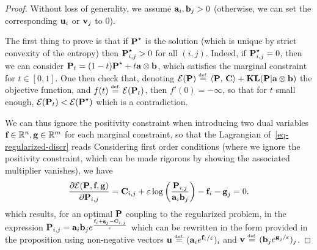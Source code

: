 \begin{proof} 
Without loss of generality, we assume $\a_i,\b_j>0$ (otherwise, we can set the corresponding $\uD_i$ or $\vD_j$ to 0).

The first thing to prove is that if $\P^\star$ is the solution (which is unique by strict convexity of the entropy) then $\P_{i,j}^\star>0$ for all $(i,j)$. Indeed, if $\P_{i,j}^\star=0$, then we can consider $\P_t = (1-t)\P^\star + t \a \otimes \b$, which satisfies the marginal constraint for $t \in [0,1]$. One then check that, denoting $\Ee(\P) \eqdef \dotp{\P}{\C}+\KLD(\P|\a \otimes \b)$ the objective function, and $f(t) \eqdef \Ee(\P_t)$, then $f'(0) = -\infty$, so that for $t$ small enough, $\Ee(\P_t)<\Ee(\P^\star)$ which is a contradiction.

We can thus ignore the positivity constraint when introducing two dual variables $\fD\in\RR^n,\gD\in\RR^m$ for each marginal constraint, so that the Lagrangian of~\eqref{eq-regularized-discr} reads
Considering first order conditions (where we ignore the positivity constraint, which can be made rigorous by showing the associated multiplier vanishes), we have
$$
	\frac{\partial\Lag(\P,\fD,\gD)}{\partial \P_{i,j}}= \C_{i,j} + \epsilon \log\pa{\frac{\P_{i,j}}{\a_i \b_j}} - \fD_i -\gD_j = 0.
$$
which results, for an optimal $\P$ coupling to the regularized problem, in the expression 
$\P_{i,j}=\a_i \b_j e^{\frac{\fD_i+\gD_j - \C_{i,j}}{\epsilon}}$ 
which can be rewritten in the form provided in the proposition using non-negative vectors $\uD \eqdef (\a_i e^{\fD_i/\varepsilon})_i$ and $\vD \eqdef (\b_j e^{\gD_j/\varepsilon})_j$.
\end{proof} 

